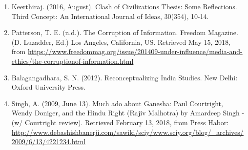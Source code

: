 \begin{multicols}{2}
\begin{enumerate}[label=$\bullet$]
\item Keerthiraj. (2016, August). Clash of Civilizations Thesis: Some Reflections. Third
Concept: An International Journal of Ideas, 30(354), 10-14.

\item Patterson, T. E. (n.d.). The Corruption of Information. Freedom Magazine. (D. Luzadder, Ed.) Los Angeles, California, US. Retrieved May 15, 2018, from \url{https://www.freedommag.org/issue/201409-under-influence/media-and-ethics/the-corruptionof-information.html}

\item Balagangadhara, S. N. (2012). Reconceptualizing India Studies. New Delhi: Oxford
University Press.

\item Singh, A. (2009, June 13). Much ado about Ganesha: Paul Courtright, Wendy Doniger, and
the Hindu Right (Rajiv Malhotra) by Amardeep Singh - (w/ Courtright review). Retrieved February 13, 2018, from Press Habor: \url{http://www.debashishbanerji.com/sawiki/sciy/www.sciy.org/blog/_archives/2009/6/13/4221234.html}
\end{enumerate}

\end{multicols}
